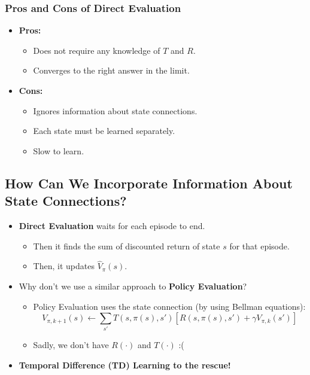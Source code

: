 \subsubsection{Pros and Cons of Direct Evaluation}
\begin{intuition}
    \begin{itemize}
        \item \textbf{Pros:}
        \begin{itemize}
            \item Does not require any knowledge of $T$ and $R$.
            \item Converges to the right answer in the limit.
        \end{itemize}
        \item \textbf{Cons:}
        \begin{itemize}
            \item Ignores information about state connections.
            \item Each state must be learned separately.
            \item Slow to learn.
        \end{itemize}
    \end{itemize}
\end{intuition}

\subsection{How Can We Incorporate Information About State Connections?}
\begin{intuition}
    \begin{itemize}
        \item \textbf{Direct Evaluation} waits for each episode to end.
        \begin{itemize}
            \item Then it finds the sum of discounted return of state $s$ for that episode.
            \item Then, it updates $\hat{V}_\pi(s)$.
        \end{itemize}
        \item Why don’t we use a similar approach to \textbf{Policy Evaluation}?
        \begin{itemize}
            \item Policy Evaluation uses the state connection (by using Bellman equations):
            \[
            V_{\pi,k+1}(s) \leftarrow \sum_{s'} T(s, \pi(s), s') \left[ R(s, \pi(s), s') + \gamma V_{\pi,k}(s') \right]
            \]
            \item Sadly, we don’t have $R(\cdot)$ and $T(\cdot)$ :(
        \end{itemize}
        \item \textbf{Temporal Difference (TD) Learning to the rescue!}
    \end{itemize}
\end{intuition}

